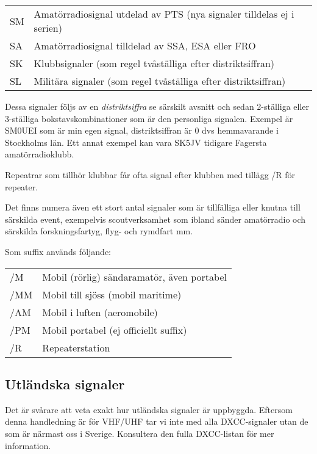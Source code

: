 \begin{tabular}{ll}
	SM & Amatörradiosignal utdelad av PTS (nya signaler tilldelas ej i serien) \\
	SA & Amatörradiosignal tilldelad av SSA, ESA eller FRO                     \\
	SK & Klubbsignaler (som regel tvåställiga efter distriktsiffran)           \\
	SL & Militära signaler (som regel tvåställiga efter distriktsiffran)
\end{tabular}

Dessa signaler följs av en \textit{distriktsiffra} se särskilt avsnitt och sedan 2-ställiga eller 3-ställiga bokstavskombinationer som är den personliga signalen. Exempel är SM0UEI som är min egen signal, distriktsiffran är 0 dvs hemmavarande i Stockholms län. Ett annat exempel kan vara SK5JV tidigare Fagersta amatörradioklubb.

Repeatrar som tillhör klubbar får ofta signal efter klubben med tillägg /R för repeater.

Det finns numera även ett stort antal signaler som är tillfälliga eller knutna till särskilda event, exempelvis scoutverksamhet som ibland sänder amatörradio och särskilda forskningsfartyg, flyg- och rymdfart mm.

Som suffix används följande:

\begin{tabular}{ll}
	/M  & Mobil (rörlig) sändaramatör, även portabel \\
	/MM & Mobil till sjöss (mobil maritime)          \\
	/AM & Mobil i luften (aeromobile)                \\
	/PM & Mobil portabel (ej officiellt suffix)\\
	/R  & Repeaterstation
\end{tabular}

\subsection{Utländska signaler}

Det är svårare att veta exakt hur utländska signaler är uppbyggda. Eftersom denna handledning är för VHF/UHF tar vi inte med alla DXCC-signaler utan de som är närmast oss i Sverige. Konsultera den fulla DXCC-listan för mer information.

